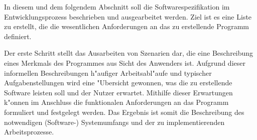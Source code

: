 In diesem und dem folgendem Abschnitt soll die Softwarespezifikation im Entwicklungsprozess beschrieben und ausgearbeitet werden.
Ziel ist es eine Liste zu erstellt, die die wesentlichen Anforderungen an das zu erstellende Programm definiert.

Der erste Schritt stellt das Ausarbeiten von Szenarien dar, die eine Beschreibung eines Merkmals des Programmes aus Sicht des Anwenders ist.
Aufgrund dieser informellen Beschreibungen h"aufiger Arbeitsabl"aufe und typischer Aufgabenstellungen wird eine "Ubersicht gewonnen, was die zu erstellende Software leisten soll und der Nutzer erwartet.
Mithilfe dieser Erwartungen k"onnen im Anschluss die funktionalen Anforderungen an das Programm formuliert und festgelegt werden.
Das Ergebnis ist somit die Beschreibung des notwendigen (Software-) Systemumfangs und der zu implementierenden Arbeitsprozesse.

